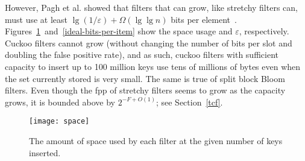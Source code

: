 \documentclass[letterpaper,twocolumn,10pt]{article}
\newcommand{\etal}{et al.}
\newcommand{\taffy}{stretchy}
\newcommand{\MTCF}{MSCF}
\newcommand{\taffy}{taffy}
\newcommand{\MTCF}{MTCF}
\begin{document}
However, Pagh \etal{} showed that filters that can grow, like \taffy{} filters can, must use at least $\lg (1/\varepsilon) + \Omega(\lg \lg n)$ bits per element~\cite{psw}.
Figures~\ref{space-steps}~and~\ref{ideal-bits-per-item} show the space usage and $\varepsilon$, respectively.
Cuckoo filters cannot grow (without changing the number of bits per slot and doubling the false positive rate), and as such, cuckoo filters with sufficient capacity to insert up to 100 million keys use tens of millions of bytes even when the set currently stored is very small.
The same is true of split block Bloom filters.
Even though the fpp of \taffy{} filters seems to grow as the capacity grows, it is bounded above by $2^{-F+O(1)}$; see Section~\ref{tcf}.










\begin{figure}[b!]
  \texttt{[image: space]}
  \caption{
    \label{space-steps}
    The amount of space used by each filter at the given number of keys inserted.
  }
\end{figure}
\end{document}
